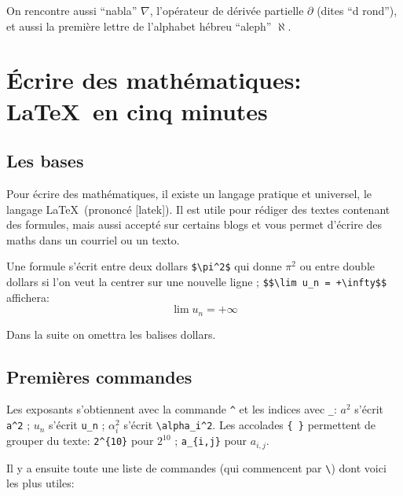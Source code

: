 \documentclass[class=report,crop=false]{standalone}
\begin{document}
\medskip

On rencontre aussi ``nabla'' $\nabla$, l'opérateur de dérivée
partielle $\partial$ (dites ``d rond''), et aussi la première
lettre de l'alphabet hébreu ``aleph'' $\aleph$.


\newpage
\section{Écrire des mathématiques: \LaTeX\ en cinq minutes}

\subsection{Les bases}

Pour écrire des mathématiques, il existe un langage pratique et universel,
le langage \LaTeX\ (prononcé [latek]). Il est utile pour rédiger des textes contenant des formules,
mais aussi accepté sur certains blogs et vous permet d'écrire des maths
dans un courriel ou un texto.

\bigskip

Une formule s'écrit entre deux dollars \verb?$\pi^2$? qui donne $\pi^2$ ou entre double dollars
si l'on veut la centrer sur une nouvelle ligne ; \verb?$$\lim u_n = +\infty$$? affichera:
$$\lim u_n = + \infty$$

Dans la suite on omettra les balises dollars.


\subsection{Premières commandes}

Les exposants s'obtiennent avec la commande \verb?^? et les indices avec \verb?_?:
 $a^2$ s'écrit \verb?a^2? ; $u_n$ s'écrit \verb?u_n? ; $\alpha_i^2$ s'écrit \verb?\alpha_i^2?.
Les accolades \verb?{ }? permettent de grouper du texte: \verb?2^{10}? pour $2^{10}$ ;
 \verb?a_{i,j}? pour $a_{i,j}$.


Il y a ensuite toute une liste de commandes (qui commencent par \verb?\?) dont voici les plus utiles:
\end{document}
